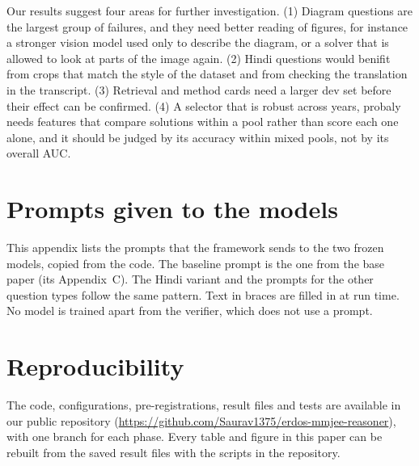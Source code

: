 \documentclass[conference]{IEEEtran}
\begin{document}
Our results suggest four areas for further investigation. (1) Diagram questions are the largest group of failures,
and they need better reading of figures, for instance a stronger vision model used only to
describe the diagram, or a solver that is allowed to look at parts of the image again. (2) Hindi
questions would benifit from crops that match the style of the dataset and from checking the
translation in the transcript. (3) Retrieval and method cards need a larger dev set before their
effect can be confirmed. (4) A
selector that is robust across years, probaly needs features that compare solutions within a
pool rather than score each one alone, and it should be judged by its accuracy within mixed
pools, not by its overall AUC.

\appendices
\section{Prompts given to the models}\label{app:prompts}
This appendix lists the prompts that the framework sends to the two frozen models, copied from
the code. The baseline prompt is the one from the base paper (its Appendix~C). The Hindi variant
and the prompts for the other question types follow the same pattern. Text in braces are filled in
at run time. No model is trained apart from the verifier, which does not use a prompt.



\section*{Reproducibility}
The code, configurations, pre-registrations, result files and tests are available in our public
repository (\url{https://github.com/Saurav1375/erdos-mmjee-reasoner}), with one branch for each
phase. Every table and figure in this paper can be rebuilt from the saved result files with the
scripts in the repository.
\end{document}

